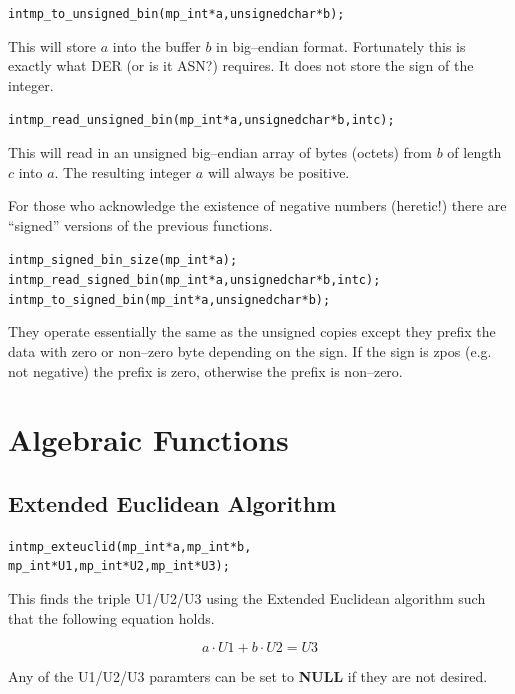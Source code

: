 \documentclass[synpaper]{book}
\begin{document}
\begin{alltt}
int mp_to_unsigned_bin(mp_int *a, unsigned char *b);
\end{alltt}
This will store $a$ into the buffer $b$ in big--endian format.  Fortunately this is exactly what DER (or is it ASN?)
requires.  It does not store the sign of the integer.

\begin{alltt}
int mp_read_unsigned_bin(mp_int *a, unsigned char *b, int c);
\end{alltt}
This will read in an unsigned big--endian array of bytes (octets) from $b$ of length $c$ into $a$.  The resulting
integer $a$ will always be positive.

For those who acknowledge the existence of negative numbers (heretic!) there are ``signed'' versions of the
previous functions.

\begin{alltt}
int mp_signed_bin_size(mp_int *a);
int mp_read_signed_bin(mp_int *a, unsigned char *b, int c);
int mp_to_signed_bin(mp_int *a, unsigned char *b);
\end{alltt}
They operate essentially the same as the unsigned copies except they prefix the data with zero or non--zero
byte depending on the sign.  If the sign is zpos (e.g. not negative) the prefix is zero, otherwise the prefix
is non--zero.  

\chapter{Algebraic Functions}
\section{Extended Euclidean Algorithm}
\begin{alltt}
int mp_exteuclid(mp_int *a, mp_int *b, 
                 mp_int *U1, mp_int *U2, mp_int *U3);
\end{alltt}

This finds the triple U1/U2/U3 using the Extended Euclidean algorithm such that the following equation holds.

\begin{equation}
a \cdot U1 + b \cdot U2 = U3
\end{equation}

Any of the U1/U2/U3 paramters can be set to \textbf{NULL} if they are not desired.  
\end{document}
